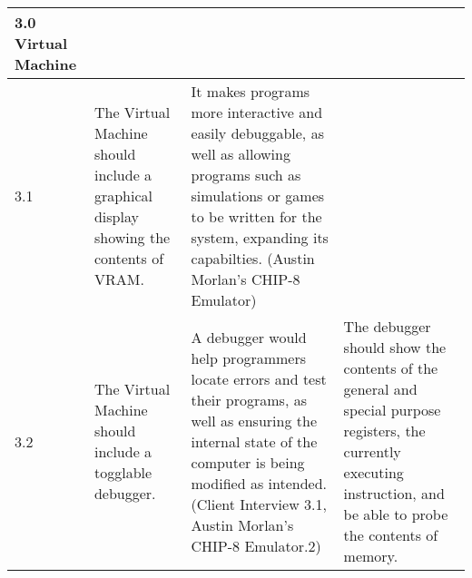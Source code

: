 \begin{longtable}{ | p{2cm} | p{4cm} | p{5cm} | p{4cm} | }
    \hline
        3.0 Virtual Machine & 
        &
        & 
       \\
    \hline
        3.1 & 
        The Virtual Machine should include a graphical display showing the contents of VRAM. &
        It makes programs more interactive and easily debuggable, as well as allowing programs such as simulations or games to be written for the system, expanding its capabilties. (Austin Morlan's CHIP-8 Emulator) & 
        \\
    \hline
        3.2 & 
        The Virtual Machine should include a togglable debugger. &
        A debugger would help programmers locate errors and test their programs, as well as ensuring the internal state of the computer is being modified as intended. (Client Interview 3.1, Austin Morlan's CHIP-8 Emulator.2) & 
        The debugger should show the contents of the general and special purpose registers, the currently executing instruction, and be able to probe the contents of memory. \\
        \hline
\end{longtable}
